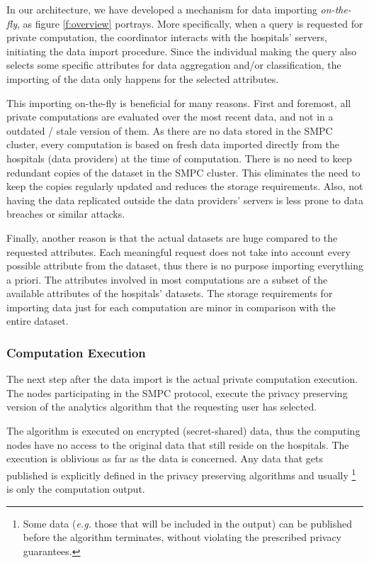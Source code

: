 In our architecture, we have developed a mechanism for data importing \textit{on-the-fly}, as figure \ref{f:overview} portrays.
More specifically, when a query is requested for private computation, the coordinator interacts with the hospitals' servers, initiating the data import procedure.
Since the individual making the query also selects some specific attributes for data aggregation and/or classification, the importing of the data only happens for the selected attributes.

This importing on-the-fly is beneficial for many reasons.
First and foremost, all private computations are evaluated over the most recent data, and not in a outdated / stale version of them.
As there are no data stored in the SMPC cluster, every computation is based on fresh data imported directly from the hospitals (data providers) at the time of computation.
There is no need to keep redundant copies of the dataset in the SMPC cluster.
This eliminates the need to keep the copies regularly updated and reduces the storage requirements.
Also, not having the data replicated outside the data providers' servers is less prone to data breaches or similar attacks.

Finally, another reason is that the actual datasets are huge compared to the requested attributes.
Each meaningful request does not take into account every possible attribute from the dataset, thus there is no purpose importing everything a priori.
The attributes involved in most computations are a subset of the available attributes of the hospitals' datasets.
The storage requirements for importing data just for each computation are minor in comparison with the entire dataset.


\subsubsection{Computation Execution}\label{sss:computation-execution}
The next step after the data import is the actual private computation execution.
The nodes participating in the SMPC protocol, execute the privacy preserving version of the analytics algorithm that the requesting user has selected.

The algorithm is executed on encrypted (secret\hyp shared) data, thus the computing nodes have no access to the original data that still reside on the hospitals.
The execution is oblivious as far as the data is concerned.
Any data that gets published is explicitly defined in the privacy preserving algorithms and usually \footnote{Some data (\textit{e.g.} those that will be included in the output) can be published before the algorithm terminates, without violating the prescribed privacy guarantees.} is only the computation output.


